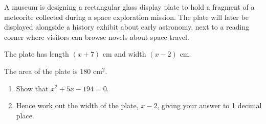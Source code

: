 \begin{question}
\noindent A museum is designing a rectangular glass display plate to hold a fragment of a meteorite collected during a space exploration mission. The plate will later be displayed alongside a history exhibit about early astronomy, next to a reading corner where visitors can browse novels about space travel.

The plate has length $(x + 7)$ cm and width $(x - 2)$ cm.

\begin{center}
\end{center}

\noindent The area of the plate is $180 \text{ cm}^2$.

\begin{enumerate}
    \item[(a)] Show that $x^2 + 5x - 194 = 0$.
    \vspace{3cm}

    \item[(b)] Hence work out the width of the plate, $x - 2$, giving your answer to 1 decimal place.
    \vspace{5cm}
\end{enumerate}
\end{question}